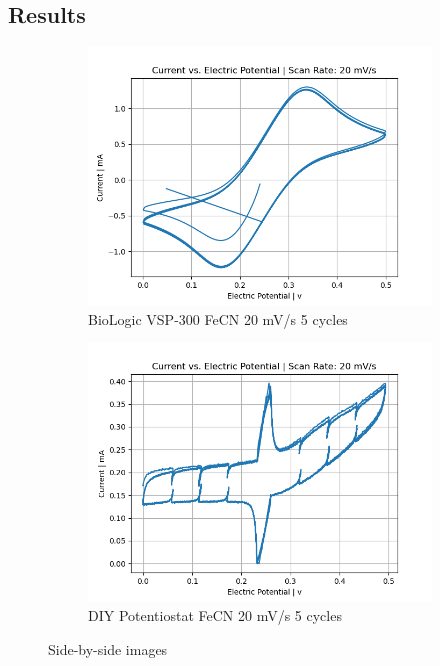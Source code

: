 \documentclass{article}
\begin{document}
\subsection*{Results}
\begin{figure}[H]
  \centering
  \begin{subfigure}[b]{0.45\textwidth}
    \includegraphics[width=\textwidth]{FECN_20mVs_5cycles_lab.png}
    \caption{BioLogic VSP-300 FeCN 20 mV/s 5 cycles}
  \end{subfigure}
  \hfill
  \begin{subfigure}[b]{0.45\textwidth}
    \includegraphics[width=\textwidth]{FECN_20mVs_5cycles.png}
    \caption{DIY Potentiostat FeCN 20 mV/s 5 cycles}
  \end{subfigure}
  \caption{Side-by-side images}
\end{figure}
\end{document}
